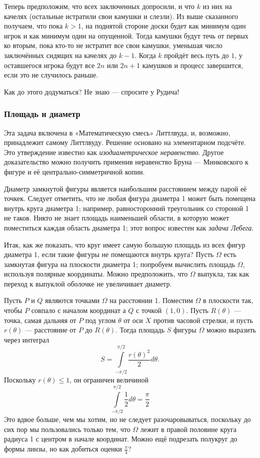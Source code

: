 Теперь предположим, что всех заключенных допросили, и что $k$ из них на качелях (остальные истратили свои камушки и слезли).
Из выше сказанного получаем, что пока $k>1$, на поднятой стороне доски будет как минимум один игрок и как минимум один на опущенной.
Тогда камушки будут течь от первых ко вторым, пока кто-то не истратит все свои камушки, уменьшая число заключённых сидящих на качелях до $k-1$.
Когда $k$ пройдёт весь путь до $1$, у оставшегося игрока будут все $2n$ или $2n+1$ камушков и процесс завершится, если это не случилось раньше.
\heart

Как до этого додуматься?
Не  знаю --- спросите у Рудича!

\subsubsection*{Площадь и диаметр}

Эта задача включена в «Математическую смесь» Литтлвуда, и, возможно, принадлежит самому Литтлвуду.
Решение основано на элементарном подсчёте.
Это утверждение известно как \emph{изодиаметрическое неравенство}. Другое доказательство можно получить применив неравенство Бруна --- Минковского к фигуре и её центрально-симметричной копии.

\medskip

Диаметр замкнутой фигуры является наибольшим расстоянием между парой её точкек.
Следует отметить, что не любая фигура диаметра 1 может быть помещена внутрь круга диаметра 1;
например, равносторонний треугольник со стороной 1 не таков.
Никто не знает площадь наименьшей области, в которую может поместиться каждая область диаметра 1; этот вопрос известен как \emph{задача Лебега}. 

Итак, как же показать, что круг имеет самую большую площадь из всех фигур диаметра 1, если такие фигуры не помещаются внутрь круга?
Пусть $\Omega$ есть замкнутая фигура на плоскости диаметра 1; попробуем вычислить площадь $\Omega$, используя полярные координаты.
Можно предположить, что $\Omega$ выпукла, так как переход к выпуклой оболочке не увеличивает диаметр.


Пусть $P$ и $Q$ являются точками $\Omega$ на расстоянии 1.
Поместим $\Omega$ в плоскости так, чтобы $P$ совпало с началом координат а $Q$ с точкой $(1,0)$.
Пусть $R(\theta)$ --- точка, самая дальняя от $P$ под углом $\theta$ от оси $X$ против часовой стрелки, и пусть $r(\theta)$ --- расстояние от $P$ до $R(\theta)$.
Тогда площадь $S$ фигуры $\Omega$ можно выразить через интеграл
\[S=\int\limits_{-\pi/2}^{\pi/2}\frac{r(\theta)^2}{2}d\theta.\]
Поскольку $r(\theta) \le 1$, он ограничен величиной
\[\int\limits_{-\pi/2}^{\pi/2}\frac{1}{2}d\theta=\frac\pi2\]
Это вдвое больше, чем мы хотим, но не следует разочаровываться, поскольку до сих пор мы пользовались только тем, что $\Omega$ лежит в правой половине круга радиуса 1 с центром в начале координат.
Можно ещё подрезать полукруг до формы линзы, но как добиться оценки $\tfrac\pi4$?

